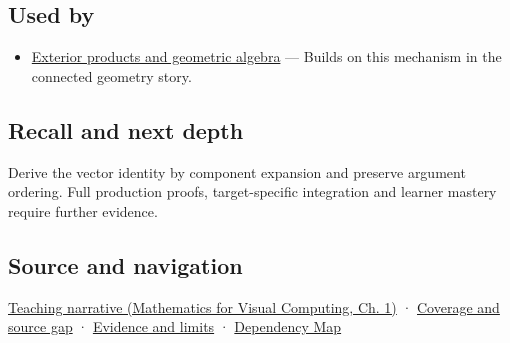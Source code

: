 \subsection{Used by}\label{appendix-5caa058bd9c7-used-by}

\hypertarget{appendix-5caa058bd9c7-used-by}{}

\begin{itemize}
\tightlist
\item
  \hyperref[appendix-e1960925d1b8]{Exterior products and geometric algebra} --- Builds on this mechanism in the connected geometry story.
\end{itemize}

\subsection{Recall and next depth}\label{appendix-5caa058bd9c7-recall-and-next-depth}

\hypertarget{appendix-5caa058bd9c7-recall-and-next-depth}{}

Derive the vector identity by component expansion and preserve argument ordering. Full production proofs, target-specific integration and learner mastery require further evidence.

\subsection{Source and navigation}\label{appendix-5caa058bd9c7-source-and-navigation}

\hypertarget{appendix-5caa058bd9c7-source-and-navigation}{}

\href{../02-Mathematics-for-Visual-Computing/main.pdf\#nameddest=01-foundations-i-ch017-signed-volume-extends-the-same-idea-into-space}{Teaching narrative (Mathematics for Visual Computing, Ch. 1)} · \hyperref[appendix-fd090d982a15-phase-6---parts-501-600]{Coverage and source gap} · \hyperref[appendix-a103e7846d21-phase-6---source-analysis-and-verification]{Evidence and limits} · \hyperref[appendix-4ad47bdd269a]{Dependency Map}
